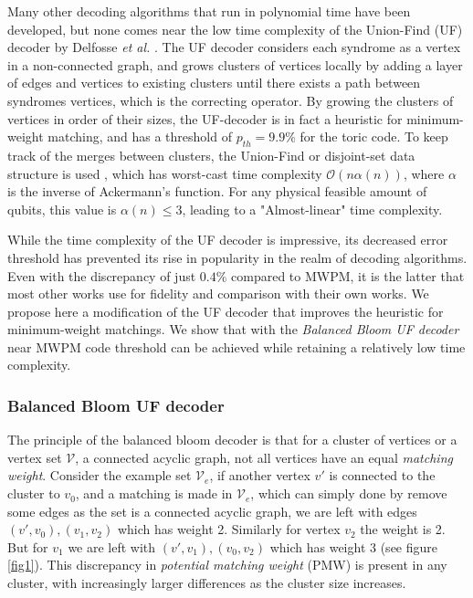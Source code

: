 \documentclass[11pt, a4paper, twoside, titlepage, usenames,dvipsnames]{report}
\begin{document}
Many other decoding algorithms that run in polynomial time have been developed, but none comes near the low time complexity of the Union-Find (UF) decoder by Delfosse \emph{et al.} \cite{delfosse2017linear, delfosse2017almost}. The UF decoder considers each syndrome as a vertex in a non-connected graph, and grows clusters of vertices locally by adding a layer of edges and vertices to existing clusters until there exists a path between syndromes vertices, which is the correcting operator. By growing the clusters of vertices in order of their sizes, the UF-decoder is in fact a heuristic for minimum-weight matching, and has a threshold of $p_{th} = 9.9\%$ for the toric code. To keep track of the merges between clusters, the Union-Find or disjoint-set data structure is used \cite{tarjan1975efficiency}, which has worst-cast time complexity $\mathcal{O}(n\alpha(n))$, where $\alpha$ is the inverse of Ackermann's function. For any physical feasible amount of qubits, this value is $\alpha(n) \leq 3$, leading to a "Almost-linear" time complexity.

While the time complexity of the UF decoder is impressive, its decreased error threshold has prevented its rise in popularity in the realm of decoding algorithms. Even with the discrepancy of just $0.4\%$ compared to MWPM, it is the latter that most other works use for fidelity and comparison with their own works. We propose here a modification of the UF decoder that improves the heuristic for minimum-weight matchings. We show that with the \emph{Balanced Bloom UF decoder} near MWPM code threshold can be achieved while retaining a relatively low time complexity.


\subsubsection{Balanced Bloom UF decoder}

The principle of the balanced bloom decoder is that for a cluster of vertices or a vertex set $\mathcal{V}$, a connected acyclic graph, not all vertices have an equal \emph{matching weight}. Consider the example set $\mathcal{V}_e$, if another vertex $v'$ is connected to the cluster to $v_0$, and a matching is made in $\mathcal{V}_e$, which can simply done by remove some edges as the set is a connected acyclic graph, we are left with edges $(v', v_0), (v_1, v_2)$ which has weight 2. Similarly for vertex $v_2$ the weight is 2. But for $v_1$ we are left with $(v', v_1), (v_0, v_2)$ which has weight 3 (see figure \ref{fig1}). This discrepancy in \emph{potential matching weight} (PMW) is present in any cluster, with increasingly larger differences as the cluster size increases.
\end{document}
